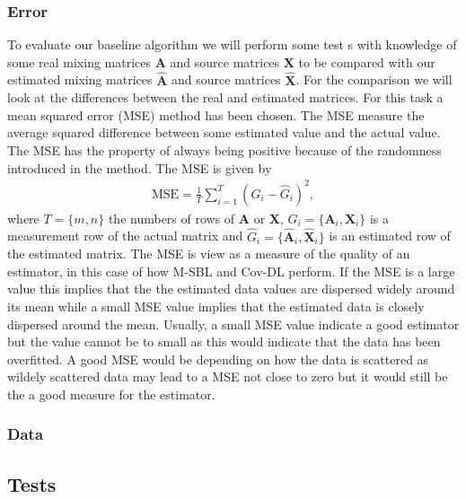 \subsubsection{Error}
To evaluate our baseline algorithm we will perform some test s with knowledge of some real mixing matrices $\mathbf{A}$ and source matrices $\mathbf{X}$ to be compared with our estimated mixing matrices $\hat{\mathbf{A}}$ and source matrices $\hat{\mathbf{X}}$. For the comparison we will look at the differences between the real and estimated matrices. For this task a mean squared error (MSE) method has been chosen. The MSE measure the average squared difference between some estimated value and the actual value. The MSE has the property of always being positive because of the randomness introduced in the method.
The MSE is given by
\begin{align*}
\text{MSE} = \frac{1}{T} \sum_{i=1}^T (G_i - \hat{G}_i)^2,  
\end{align*}
where $T = \{m,n\}$ the numbers of rows of $\mathbf{A}$ or $\mathbf{X}$, $G_i = \{ \mathbf{A}_i, \mathbf{X}_i\}$ is a measurement row of the actual matrix and $\hat{G}_i = \{\hat{\mathbf{A}}_i,\hat{\mathbf{X}}_i\}$ is an estimated row of the estimated matrix.
The MSE is view as a measure of the quality of an estimator, in this case of how M-SBL and Cov-DL perform. 
If the MSE is a large value this implies that the the estimated data values are dispersed widely around its mean while a small MSE value implies that the estimated data is closely dispersed around the mean. Usually, a small MSE value indicate a good estimator but the value cannot be to small as this would indicate that the data has been overfitted. 
A good MSE would be depending on how the data is scattered as wildely scattered data may lead to a MSE not close to zero but it would still be the a good measure for the estimator.


\subsubsection{Data}

\subsection{Tests}